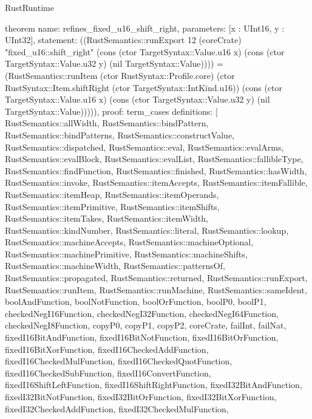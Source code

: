 \begin{lexlean}{RustRuntime}
\begin{semanticmodule}
theorem{
  name: refines_fixed_u16_shift_right,
  parameters: [x : UInt16, y : UInt32],
  statement: ((RustSemantics::runExport 12 (coreCrate) "fixed_u16::shift_right" (cons (ctor TargetSyntax::Value.u16 x) (cons (ctor TargetSyntax::Value.u32 y) (nil TargetSyntax::Value)))) = (RustSemantics::runItem (ctor RustSyntax::Profile.core) (ctor RustSyntax::Item.shiftRight (ctor TargetSyntax::IntKind.u16)) (cons (ctor TargetSyntax::Value.u16 x) (cons (ctor TargetSyntax::Value.u32 y) (nil TargetSyntax::Value))))),
  proof: term_cases{
    definitions: [
      RustSemantics::allWidth,
      RustSemantics::bindPattern,
      RustSemantics::bindPatterns,
      RustSemantics::constructValue,
      RustSemantics::dispatched,
      RustSemantics::eval,
      RustSemantics::evalArms,
      RustSemantics::evalBlock,
      RustSemantics::evalList,
      RustSemantics::fallibleType,
      RustSemantics::findFunction,
      RustSemantics::finished,
      RustSemantics::hasWidth,
      RustSemantics::invoke,
      RustSemantics::itemAccepts,
      RustSemantics::itemFallible,
      RustSemantics::itemHeap,
      RustSemantics::itemOperands,
      RustSemantics::itemPrimitive,
      RustSemantics::itemShifts,
      RustSemantics::itemTakes,
      RustSemantics::itemWidth,
      RustSemantics::kindNumber,
      RustSemantics::literal,
      RustSemantics::lookup,
      RustSemantics::machineAccepts,
      RustSemantics::machineOptional,
      RustSemantics::machinePrimitive,
      RustSemantics::machineShifts,
      RustSemantics::machineWidth,
      RustSemantics::patternsOf,
      RustSemantics::propagated,
      RustSemantics::returned,
      RustSemantics::runExport,
      RustSemantics::runItem,
      RustSemantics::runMachine,
      RustSemantics::sameIdent,
      boolAndFunction,
      boolNotFunction,
      boolOrFunction,
      boolP0,
      boolP1,
      checkedNegI16Function,
      checkedNegI32Function,
      checkedNegI64Function,
      checkedNegI8Function,
      copyP0,
      copyP1,
      copyP2,
      coreCrate,
      failInt,
      failNat,
      fixedI16BitAndFunction,
      fixedI16BitNotFunction,
      fixedI16BitOrFunction,
      fixedI16BitXorFunction,
      fixedI16CheckedAddFunction,
      fixedI16CheckedMulFunction,
      fixedI16CheckedQuotFunction,
      fixedI16CheckedSubFunction,
      fixedI16ConvertFunction,
      fixedI16ShiftLeftFunction,
      fixedI16ShiftRightFunction,
      fixedI32BitAndFunction,
      fixedI32BitNotFunction,
      fixedI32BitOrFunction,
      fixedI32BitXorFunction,
      fixedI32CheckedAddFunction,
      fixedI32CheckedMulFunction,
}}
\end{semanticmodule}
\end{lexlean}
